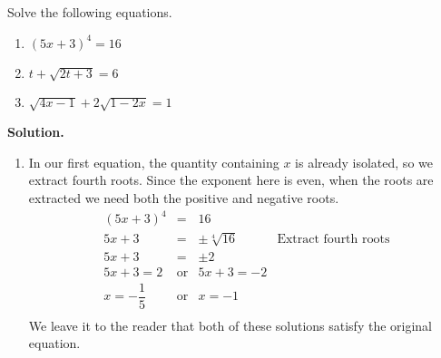 \documentclass[10pt]{article}
\begin{document}
\pagebreak

\begin{ex}\label{radicaleqnreview}  Solve the following equations.


\begin{multicols}{3}
\begin{enumerate}


\item  $(5x +3)^{4} = 16$


\item  $t + \sqrt{2t+3} = 6$

\item  $\sqrt{4x-1}  + 2\sqrt{1 - 2x} = 1$


\setcounter{HW}{\value{enumi}}
\end{enumerate}
\end{multicols}



{\bf Solution.}

\begin{enumerate}

\item  In our first equation, the quantity containing $x$ is already isolated, so we extract fourth roots. Since the exponent here is even, when the roots are extracted we need both the positive and negative roots. \[ \begin{array}{rclr}

(5x +3)^{4} & = & 16 & \\ [2pt]

5x+3 & = & \pm \sqrt[4]{16} & \text{Extract fourth roots} \\ [2pt]

5x + 3 & = & \pm 2 & \\ [2pt]

5x+3 = 2 & \text{or} & 5x+3 = -2 & \\

x = -\dfrac{1}{5} & \text{or} & x = -1 \\ \end{array} \] We leave it to the reader that both of these solutions satisfy the original equation.


\end{enumerate}
\end{ex}
\end{document}

